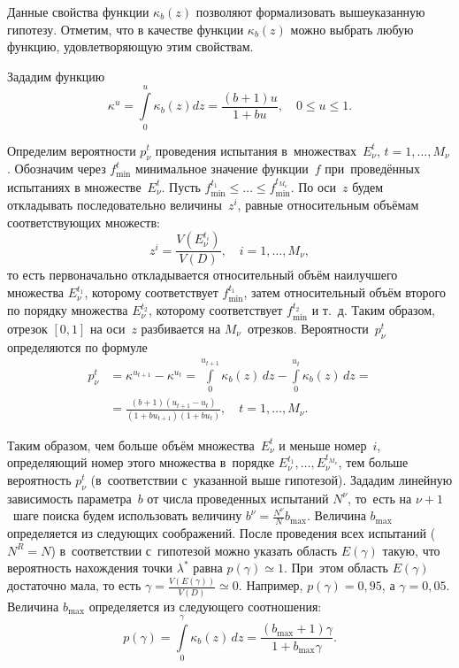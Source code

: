 \documentclass[twoside]{article}
\begin{document}
Данные свойства функции $\kappa_{b}(z)$ позволяют формализовать
вышеуказанную гипотезу. Отметим, что в качестве функции $\kappa_{b}(z)$ можно
выбрать любую функцию, удовлетворяющую этим свойствам.

Зададим функцию
$$ \kappa^{u}=\int\limits_{0}^{u}\kappa_{b}(z)dz=
\frac{(b+1)u}{1+bu},\quad 0 \leq u \leq 1.$$

Определим вероятности $p^{t}_{\nu}$ проведения испытания в~множествах~$E^{t}_{\nu}$,
\: $t=1,\ldots,M_\nu$.
Обозначим через $f^{t}_{\min}$ минимальное значение функции~$f$
при~проведённых испытаниях в множестве~$E^{t}_{\nu}$.
Пусть $f^{t_1}_{\min}\leq \ldots\leq f^{t_{M_\nu}}_{\min}$.
По оси~$z$ будем откладывать последовательно величины~$z^i$, равные
относительным объёмам соответствующих множеств:
 $$z^i=\frac{V(E^{t_i}_{\nu})}{V(D)}, \quad i=1,\ldots,M_\nu,$$
то есть первоначально откладывается относительный объём наилучшего
множества $E^{t_{1}}_{\nu}$, которому соответствует $f_{\min}^{t_{1}}$, затем
относительный объём второго по порядку множества $E^{t_{2}}_{\nu}$,
которому соответствует $f_{\min}^{t_{2}}$ и т.~д. Таким образом, отрезок $[0,1]$ на
оси~$z$ разбивается на $M_{\nu}$~отрезков. Вероятности~$p^{t}_{\nu}$
определяются  по формуле
\begin{align*}
    p^{t}_{\nu}
    &=
    \kappa^{u_{t+1}}{-}\kappa^{u_{t}}
    =
    \int\limits_{0}^{u_{t+1}}\!\!\! \kappa_{b}(z)\,dz -
    \int\limits_{0}^{u_{t}}\!\! \kappa_{b}(z)\,dz
    ={}
\\
    &=
    \frac
        {(b+1)(u_{t+1}-u_{t})}
        {(1+bu_{t+1})(1+bu_{t})}, 
    \quad t=1,\ldots,M_\nu.
\end{align*}


Таким образом, чем больше объём множества~$E^{t}_{\nu}$ и
меньше номер~$i$, определяющий номер этого множества в~порядке
$E^{t_{1}}_{\nu},\ldots,E^{t_{M_\nu}}_{\nu}$, тем больше
вероятность $p^{t}_{\nu}$ (в~соответствии с~указанной выше гипотезой).
Зададим линейную зависимость параметра~$b$ от числа проведенных испытаний
$N^{\nu}$, то~есть на $\nu +1$~шаге поиска будем использовать величину
$b^{\nu}=\frac{N^{\nu}}{N}b_{\max}$. Величина $b_{\max}$
определяется из следующих соображений. После проведения всех испытаний
($N^{R}=N$) в~соответствии с~гипотезой можно указать область $E(\gamma)$
такую, что вероятность нахождения точки $\lambda^*$ равна
$p(\gamma)\simeq 1$. При~этом область $E(\gamma)$ достаточно мала, то есть
$\gamma=\frac{V(E(\gamma))}{V(D)} \simeq 0$. Например,
$p(\gamma)=0{,}95$, а $\gamma =0{,}05$.
Величина $b_{\max}$ определяется из следующего соотношения:
$$ p(\gamma)=\int\limits_{0}^{\gamma}\!\kappa_{b}(z)\,dz=
\frac{(b_{\max}+1)\gamma}{1+b_{\max}\gamma}.
$$
\end{document}
